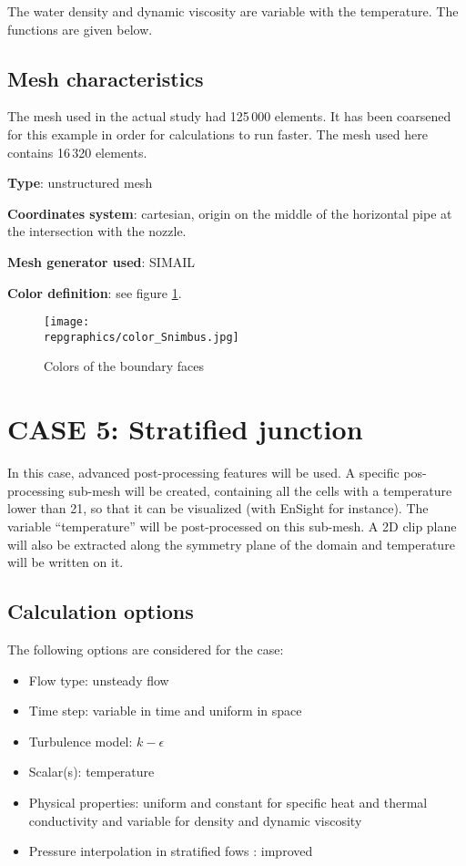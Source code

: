 The water density and dynamic viscosity are variable with the temperature. The
functions are given below.


        \subsection{Mesh characteristics}
The mesh used in the actual study had 125\,000 elements. It has been coarsened
for this example in order for calculations to run faster. The mesh used here
contains 16\,320 elements.

{\bfseries Type}: unstructured mesh

{\bfseries Coordinates system}: cartesian, origin on the middle of the horizontal pipe at the intersection with the nozzle.

{\bfseries Mesh generator used}: SIMAIL

{\bfseries Color definition}: see figure \ref{fige1_e5}.

\begin{figure}[h!]
\begin{center}
\texttt{[image: \\repgraphics/color\_Snimbus.jpg]}
\caption{Colors of the boundary faces}
\label{fige1_e5}
\end{center}
\end{figure}


\section{CASE 5: Stratified junction}
In this case, advanced post-processing features will be used. A specific
pos-processing sub-mesh will be created, containing all the cells with a
temperature lower than 21\degresC, so that it can be visualized (with EnSight
for instance). The variable ``temperature'' will be post-processed on this
sub-mesh. A 2D clip plane will also be extracted along the symmetry plane of the
domain and temperature will be written on it.


        \subsection{Calculation options}

The following options are considered for the case:
\begin{itemize}
\renewcommand{\labelitemi}{$\rightarrow$}
        \item Flow type: unsteady flow
        \item Time step: variable in time and uniform in space
        \item Turbulence model: $k-\epsilon$
        \item Scalar(s): temperature
        \item Physical properties: uniform and constant for specific heat and
thermal conductivity and variable for density and dynamic viscosity
        \item Pressure interpolation in stratified fows : improved
\end{itemize}


